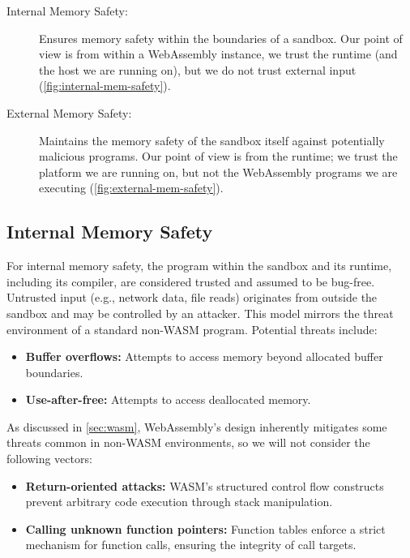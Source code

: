 \begin{description}
    \item[Internal Memory Safety:] Ensures memory safety within the boundaries of a sandbox.
    Our point of view is from within a WebAssembly instance, we trust the runtime (and the host we are running on), but we do not trust external input (\cref{fig:internal-mem-safety}).
    \item[External Memory Safety:] Maintains the memory safety of the sandbox itself against potentially malicious programs.
    Our point of view is from the runtime; we trust the platform we are running on, but not the WebAssembly programs we are executing (\cref{fig:external-mem-safety}).
\end{description}

\subsection{Internal Memory Safety}
\label{subsec:internal-memory-safety}
For internal memory safety, the program within the sandbox and its runtime, including its compiler, are considered trusted and assumed to be bug-free.
Untrusted input (e.g., network data, file reads) originates from outside the sandbox and may be controlled by an attacker.
This model mirrors the threat environment of a standard non-\ac{WASM} program.
Potential threats include:

\begin{itemize}
    \item \textbf{Buffer overflows:} Attempts to access memory beyond allocated buffer boundaries.
    \item \textbf{Use-after-free:} Attempts to access deallocated memory.
\end{itemize}

\noindent
As discussed in \cref{sec:wasm}, WebAssembly's design inherently mitigates some threats common in non-\ac{WASM} environments, so we will not consider the following vectors:

\begin{itemize}
    \item \textbf{Return-oriented attacks:} {\ac{WASM}'s} structured control flow constructs prevent arbitrary code execution through stack manipulation.
    \item \textbf{Calling unknown function pointers:} Function tables enforce a strict mechanism for function calls, ensuring the integrity of call targets.
\end{itemize}


